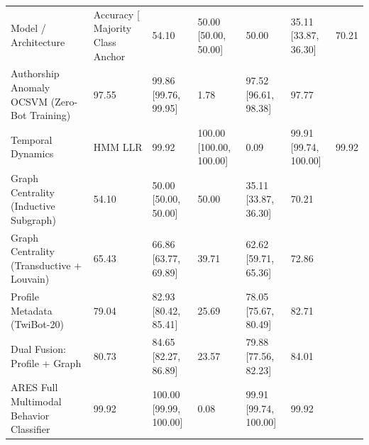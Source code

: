 \begin{tabular}{llllll}
\toprule
Model / Architecture & Accuracy [%
\midrule
Majority Class Anchor & 54.10 & 50.00 [50.00, 50.00] & 50.00 & 35.11 [33.87, 36.30] & 70.21 \\
Authorship Anomaly OCSVM (Zero-Bot Training) & 97.55 & 99.86 [99.76, 99.95] & 1.78 & 97.52 [96.61, 98.38] & 97.77 \\
Temporal Dynamics & HMM LLR & 99.92 & 100.00 [100.00, 100.00] & 0.09 & 99.91 [99.74, 100.00] & 99.92 \\
Graph Centrality (Inductive Subgraph) & 54.10 & 50.00 [50.00, 50.00] & 50.00 & 35.11 [33.87, 36.30] & 70.21 \\
Graph Centrality (Transductive + Louvain) & 65.43 & 66.86 [63.77, 69.89] & 39.71 & 62.62 [59.71, 65.36] & 72.86 \\
Profile Metadata (TwiBot-20) & 79.04 & 82.93 [80.42, 85.41] & 25.69 & 78.05 [75.67, 80.49] & 82.71 \\
Dual Fusion: Profile + Graph & 80.73 & 84.65 [82.27, 86.89] & 23.57 & 79.88 [77.56, 82.23] & 84.01 \\
ARES Full Multimodal Behavior Classifier & 99.92 & 100.00 [99.99, 100.00] & 0.08 & 99.91 [99.74, 100.00] & 99.92 \\
\bottomrule
\end{tabular}
